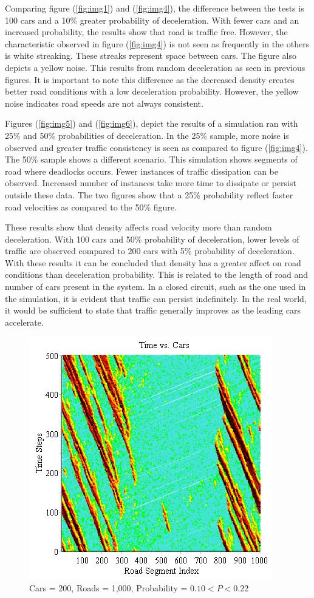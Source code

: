 \documentclass[12pt]{extarticle}
\begin{document}
Comparing figure (\ref{fig:img1}) and (\ref{fig:img4}), the difference between the tests is 100 cars and a 10\% greater probability of deceleration. With fewer cars and an increased probability, the results show that road is traffic free. However, the characteristic observed in figure (\ref{fig:img4}) is not seen as frequently in the others is white streaking. These streaks represent space between cars. The figure also depicts a yellow noise. This results from random deceleration as seen in previous figures. It is important to note this difference as the decreased density creates better road conditions with a low deceleration probability. However, the yellow noise indicates road speeds are not always consistent.

Figures (\ref{fig:img5}) and (\ref{fig:img6}), depict the results of a simulation ran with 25\% and 50\% probabilities of deceleration. In the 25\% sample, more noise is observed and greater traffic consistency is seen as compared to figure (\ref{fig:img4}). The 50\% sample shows a different scenario. This simulation shows segments of road where deadlocks occurs. Fewer instances of traffic dissipation can be observed. Increased number of instances take more time to dissipate or persist outside these data. The two figures show that a 25\% probability reflect faster road velocities as compared to the 50\% figure. 

These results show that density affects road velocity more than random deceleration. With 100 cars and 50\% probability of deceleration, lower levels of traffic are observed compared to 200 cars with 5\% probability of deceleration. With these results it can be concluded that density has a greater affect on road conditions than deceleration probability. This is related to the length of road and number of cars present in the system. In a closed circuit, such as the one used in the simulation, it is evident that traffic can persist indefinitely. In the real world, it would be sufficient to state that traffic generally improves as the leading cars accelerate. 
\begin{figure}
	\includegraphics[scale=0.50]{Graph7.png}
	\caption{Cars = 200, Roads = 1,000, \newline Probability = $0.10 < P < 0.22$}
	\label{fig:img7}
\end{figure}
\end{document}
